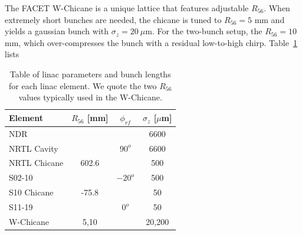 \documentclass[%
twocolumn,
showpacs,preprintnumbers,
 aps,
prstab,
]{revtex4-1}
\begin{document}
The FACET W-Chicane is a unique lattice that features adjustable $R_{56}$.  When extremely short bunches are needed, the chicane is tuned to $R_{56} = 5$ mm and yields a gaussian bunch with $\sigma_z = 20~\mu$m. For the two-bunch setup, the $R_{56} = 10$ mm, which over-compresses the bunch with a residual low-to-high chirp. Table~\ref{dat_table} lists 

\begin{table}
  \begin{tabular}{ l c c c}
    \hline
    Element & $R_{56}$ [mm] & $\phi_{rf}$ & $\sigma_z$ [$\mu$m] \\ \hline
    NDR &  & & 6600 \\
    NRTL Cavity &  & $ 90^o$ & 6600 \\
    NRTL Chicane & 602.6 & & 500 \\
    S02-10 &  & $-20^o$ & 500 \\
    S10 Chicane & -75.8 & & 50 \\
    S11-19 & & $0^o$ & 50 \\
    W-Chicane & 5,10 & & 20,200 \\
    \hline
  \end{tabular}
   \caption{Table of linac parameters and bunch lengths for each linac element. We quote the two $R_{56}$ values typically used in the W-Chicane.}
   \label{dat_table}
\end{table}





\end{document}
